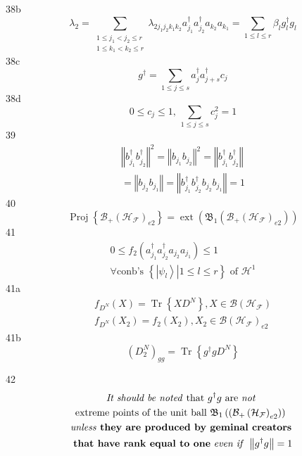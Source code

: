\documentclass[aps,preprint]{revtex4}%
\begin{document}
38b%
\[
\lambda_{2}=\sum_{\substack{1\leq j_{1}<j_{2}\leq r\\1\leq k_{1}<k_{2}\leq
r}}\lambda_{2j_{1}j_{2}k_{1}k_{2}}a_{j_{1}}^{\dagger}a_{j_{2}}^{\dagger
}a_{k_{2}}a_{k_{1}}=\sum_{1\leq l\leq r}\beta_{l}g_{l}^{\dagger}g_{l}%
\]
38c%
\[
g^{\dagger}=\sum_{1\leq j\leq s}a_{j}^{\dagger}a_{j+s}^{\dagger}c_{j}%
\]
38d%
\[
0\leq c_{j}\leq1,\,\sum_{1\leq j\leq s}c_{j}^{2}=1
\]
39%
\begin{gather*}
\left\Vert b_{j_{1}}^{\dagger}b_{j_{2}}^{\dagger}\right\Vert ^{2}=\left\Vert
b_{j_{1}}b_{j_{2}}\right\Vert ^{2}=\left\Vert b_{j_{1}}^{\dagger}b_{j_{2}%
}^{\dagger}\right\Vert \\
=\left\Vert b_{j_{2}}b_{j_{1}}\right\Vert =\left\Vert b_{j_{1}}^{\dagger
}b_{j_{2}}^{\dagger}b_{j_{2}}b_{j_{1}}\right\Vert =1
\end{gather*}
40%
\[
\operatorname*{Proj}\left\{  \mathcal{B}_{+}\left(  \mathcal{H}_{\mathcal{F}%
}\right)  _{e2}\right\}  =\operatorname*{ext}\left(  \mathfrak{B}_{1}\left(
\mathcal{B}_{+}\left(  \mathcal{H}_{\mathcal{F}}\right)  _{e2}\right)
\right)
\]
41%
\begin{gather*}
0\leq f_{2}\left(  a_{j_{1}}^{\dagger}a_{j_{2}}^{\dagger}a_{j_{2}}a_{j_{1}%
}\right)  \leq1\,\\
\forall\text{conb's }\left\{  \left.  \left\vert \psi_{l}\right\rangle
\right\vert 1\leq l\leq r\right\}  \text{ of }\mathcal{H}^{1}%
\end{gather*}
41a%
\begin{gather*}
f_{D^{N}}\left(  X\right)  =\operatorname*{Tr}\left\{  XD^{N}\right\}
,X\in\mathcal{B}\left(  \mathcal{H}_{\mathcal{F}}\right)  \\
f_{D^{N}}\left(  X_{2}\right)  =f_{2}\left(  X_{2}\right)  ,X_{2}%
\in\mathcal{B}\left(  \mathcal{H}_{\mathcal{F}}\right)  _{e2}%
\end{gather*}
41b%
\[
\left(  D_{2}^{N}\right)  _{gg}=\operatorname*{Tr}\left\{  g^{\dagger}%
gD^{N}\right\}
\]


42
\begin{gather*}
\text{\emph{It should be noted }that }g^{\dagger}g\text{ are \emph{not }}\\
\text{extreme points of the unit ball }\mathfrak{B}_{1}\left(  \left(
\mathcal{B}_{+}\left(  \mathcal{H}_{\mathcal{F}}\right)  _{e2}\right)
\right)  \text{ }\\
\text{\emph{unless }\textbf{they are produced by geminal creators }}\\
\text{\textbf{that have rank equal to one} \emph{even if }}\left\Vert
g^{\dagger}g\right\Vert =1
\end{gather*}
\end{document}
